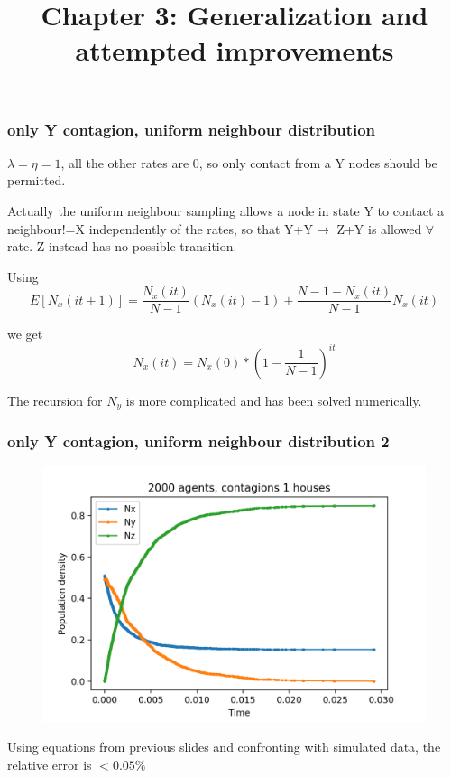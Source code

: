 \documentclass{beamer}
\begin{document}
		
	\begin{frame}
	\title{Chapter 3: Generalization and attempted improvements}
	\subtitle{}
	\date{}
	\titlepage
	\end{frame}


\begin{frame}
	\frametitle{only Y contagion, uniform neighbour distribution}
	
	 $\lambda=\eta=1$, all the other rates are 0, so only contact from a Y nodes should be permitted.
	
	\vspace{5 pt}
	 
	 Actually the uniform neighbour sampling allows a node in state Y to contact a neighbour!=X independently of the rates, so that Y+Y$\rightarrow$ Z+Y is allowed $\forall$ rate. Z instead has no possible transition.
	
	Using $$E[N_x(it+1)]=\frac{N_x(it)}{N-1} (N_x(it)-1)+\frac{N-1-N_x(it)}{N-1} N_x(it)$$
	
	we get $$N_x(it)=N_x(0)*(1-\frac{1}{N-1})^{it}$$	
	
	The recursion for $N_y$ is more complicated and has been solved numerically.

\end{frame}

	\begin{frame}
	\frametitle{only Y contagion, uniform neighbour distribution 2}
		\begin{figure}
			\centering
			\includegraphics[width=0.5\linewidth]{only_Y_contagion_2000_complete_graph_uniform_neighbour}
			\caption*{}
			\label{fig:onlyycontagion2000completegraphuniformneighbour}
		\end{figure}
	
	Using equations from previous slides and confronting with simulated data, the relative error is $< 0.05\%$
	
	\vspace{10 pt}
	\end{frame}
\end{document}
